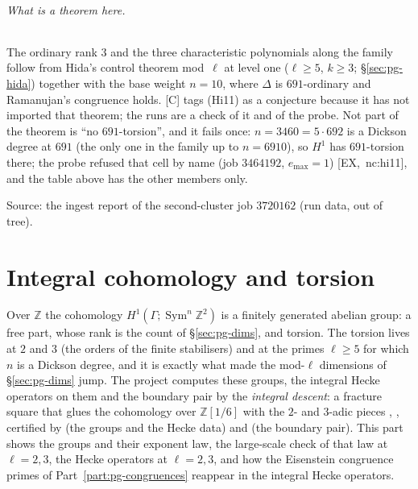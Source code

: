 \documentclass[11pt]{article}
\newcommand{\Z}{\mathbb{Z}}
\newcommand{\Sym}{\operatorname{Sym}}
\newcommand{\Ga}{\Gamma}
\begin{document}
\paragraph{What is a theorem here.} The ordinary rank $3$ and the three characteristic polynomials along the family follow from Hida's
control theorem mod~$\ell$ at level one ($\ell\ge5$, $k\ge3$; \S\ref{sec:pg-hida}) together with the base weight $n=10$, where $\Delta$ is
$691$-ordinary and Ramanujan's congruence holds. [C] tags (Hi11) as a conjecture because it has not imported that theorem; the runs are a
check of it and of the probe. Not part of the theorem is ``no $691$-torsion'', and it fails once: $n=3460=5\cdot692$ is a Dickson degree at
$691$ (the only one in the family up to $n=6910$), so $H^{1}$ has $691$-torsion there; the probe refused that cell by name (job $3464192$,
$e_{\max}=1$) [EX,~nc:hi11], and the table above has the other members only.

\noindent Source: the ingest report of the second-cluster job $3720162$ (run data, out of tree).

\part{Integral cohomology and torsion}\label{part:pg-integral}

Over $\Z$ the cohomology $H^{1}(\Ga;\Sym^{n}\Z^{2})$ is a finitely generated abelian group: a free part, whose rank is the count of
\S\ref{sec:pg-dims}, and torsion. The torsion lives at $2$ and $3$ (the orders of the finite stabilisers) and at the primes $\ell\ge5$ for which
$n$ is a Dickson degree, and it is exactly what made the mod-$\ell$ dimensions of \S\ref{sec:pg-dims} jump. The project computes these groups,
the integral Hecke operators on them and the boundary pair by the \emph{integral descent}: a fracture square that glues the cohomology over
$\Z[1/6]$ with the $2$- and $3$-adic pieces {}, {}, certified by
{} (the groups and the Hecke data) and {} (the boundary pair). This part shows the groups and their exponent law, the large-scale check of that law at $\ell=2,3$, the Hecke
operators at $\ell=2,3$, and how the Eisenstein congruence primes of Part~\ref{part:pg-congruences} reappear in the integral Hecke operators.

\end{document}
